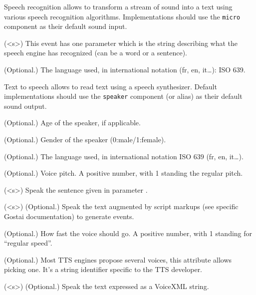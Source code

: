 
Speech recognition allows to transform a stream of sound into a text
using various speech recognition algorithms. Implementations
should use the \lstinline{micro} component as their default sound input.

\begin{urbiscriptapi}
\item[hear](<s>) This event has one parameter which is the string describing
  what the speech engine has recognized (can be a word or a sentence).


\item[lang]{} (Optional.)  The language used, in international notation (fr,
  en, it…): ISO 639.
\end{urbiscriptapi}

Text to speech allows to read text using a speech synthesizer. Default
implementations should use the \lstinline{speaker} component (or alias) as
their default sound output.

\begin{urbiscriptapi}
\item[age]{} (Optional.) Age of the speaker, if applicable.


\item[gender]{} (Optional.) Gender of the speaker (0:male/1:female).


\item[lang]{} (Optional.) The language used, in international notation ISO 639
  (fr, en, it\ldots).


\item[pitch]{} (Optional.) Voice pitch.  A positive number, with 1 standing
  the regular pitch.


\item[say](<s>) Speak the sentence given in parameter .


\item[script](<s>) (Optional.) Speak the text  augmented by script
  markups (see specific Gostai documentation) to generate \urbi events.


\item[speed]{} (Optional.) How fast the voice should go.  A positive number,
  with 1 standing for ``regular speed''.


\item[voice]{} (Optional.) Most TTS engines propose several voices, this
  attribute allows picking one. It's a string identifier specific to the TTS
  developer.


\item[voicexml](<s>) (Optional.) Speak the text  expressed as a
  VoiceXML string.
\end{urbiscriptapi}


